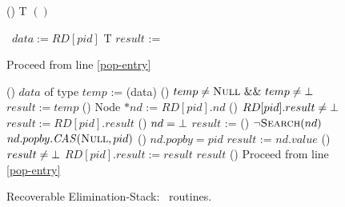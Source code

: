 \begin{figure*}[!t]
\begin{algorithm}[H]
\begin{procedure}[H]
	\end{procedure}
	
	\begin{procedure}[H]
		\caption{() T \recoverPop $()$}
		
		\info\ $data := RD[pid]$ 
		T $result$ := \init \;
		
		{Proceed from line \ref{pop-entry} }
		
		\uIf () {$data$ of type \exInfo} {
			$temp$ := \recoverExchange(data) \;
			\uIf () {$temp \neq \NULL\ \&\&\ temp \neq \init$}
				{$result := temp$}
		}
		\uElse () {
			Node $*nd$ := $RD[pid].nd$ \;
			\uIf () {$RD[pid].result \neq \mbox{$\bot$}$}
				{$result := RD[pid].result$}
			\uElseIf () {$nd = \mbox{$\bot$}$} {$result$ := \emptyst}
			\uElseIf () {$\neg \mbox{\sc Search}(nd)$} {
				$nd.popby.\mbox{\textit{CAS}}(\mbox{\sc Null}, pid)$ 
				\uIf () {$nd.popby = pid$} {$result$ := $nd.value$}
			}
		}
		\uIf () {$result \neq \mbox{$\bot$}$} {
			$RD[pid].result := result$ 
			\KwRet $result$
		}
		\uElse ()
			{Proceed from line \ref{pop-entry} }
	\end{procedure}

	\caption{Recoverable Elimination-Stack: \pop\ routines.}
	\label{alg:eliminition-stack-pop}
	\end{algorithm}
	
\end{figure*}